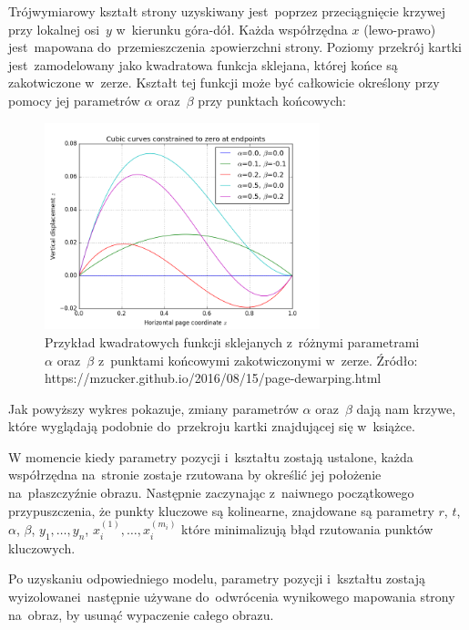 Trójwymiarowy kształt strony uzyskiwany jest~poprzez przeciągnięcie krzywej przy lokalnej osi~$y$ w~kierunku góra-dół. Każda współrzędna $x$ (lewo-prawo) jest~mapowana do~przemieszczenia $z$\linebreak powierzchni strony. Poziomy przekrój kartki jest~zamodelowany jako kwadratowa funkcja sklejana, której końce są zakotwiczone w~zerze. Kształt tej funkcji może być całkowicie określony przy pomocy jej parametrów $\alpha$ oraz~$\beta$ przy punktach końcowych:

\begin{figure}[h]
	\centering
	\includegraphics[width=8cm]{images/cubic-splines.png}
	\caption{Przykład kwadratowych funkcji sklejanych z~różnymi parametrami $\alpha$ oraz~$\beta$ z~punktami końcowymi zakotwiczonymi w~zerze. Źródło: https://mzucker.github.io/2016/08/15/page-dewarping.html}
	\label{fig:cubic-splines}
\end{figure}

Jak powyższy wykres pokazuje, zmiany parametrów $\alpha$ oraz~$\beta$ dają nam krzywe, które wyglądają podobnie do~przekroju kartki znajdującej się w~książce.

W momencie kiedy parametry pozycji i~kształtu zostają ustalone, każda współrzędna na~stronie zostaje rzutowana by określić jej położenie na~płaszczyźnie obrazu. Następnie zaczynając z~naiwnego początkowego przypuszczenia, że punkty kluczowe są kolinearne, znajdowane są parametry $r$, $t$, $\alpha$, $\beta$, $y_{1},\ldots,y_{n}$, $x_{i}^{(1)},\ldots,x_{i}^{(m_{i})}$ które minimalizują błąd rzutowania punktów kluczowych.

Po uzyskaniu odpowiedniego modelu, parametry pozycji i~kształtu zostają wyizolowane\linebreak i~następnie używane do~odwrócenia wynikowego mapowania strony na~obraz, by usunąć wypaczenie całego obrazu.




